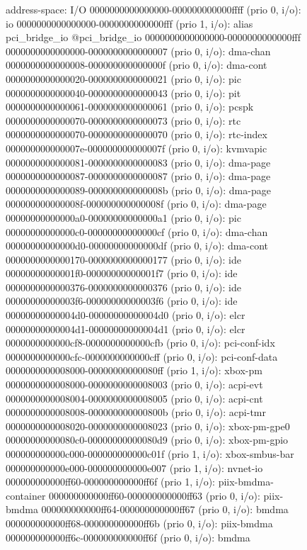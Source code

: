 \begin{figure}
\begin{minipage}{0.48\linewidth}
\begin{ffcode}
    address-space: I/O
      0000000000000000-000000000000ffff (prio 0, i/o): io
        0000000000000000-0000000000000fff (prio 1, i/o): alias pci_bridge_io @pci_bridge_io 0000000000000000-0000000000000fff
        0000000000000000-0000000000000007 (prio 0, i/o): dma-chan
        0000000000000008-000000000000000f (prio 0, i/o): dma-cont
        0000000000000020-0000000000000021 (prio 0, i/o): pic
        0000000000000040-0000000000000043 (prio 0, i/o): pit
        0000000000000061-0000000000000061 (prio 0, i/o): pcspk
        0000000000000070-0000000000000073 (prio 0, i/o): rtc
          0000000000000070-0000000000000070 (prio 0, i/o): rtc-index
        000000000000007e-000000000000007f (prio 0, i/o): kvmvapic
        0000000000000081-0000000000000083 (prio 0, i/o): dma-page
        0000000000000087-0000000000000087 (prio 0, i/o): dma-page
        0000000000000089-000000000000008b (prio 0, i/o): dma-page
        000000000000008f-000000000000008f (prio 0, i/o): dma-page
        00000000000000a0-00000000000000a1 (prio 0, i/o): pic
        00000000000000c0-00000000000000cf (prio 0, i/o): dma-chan
        00000000000000d0-00000000000000df (prio 0, i/o): dma-cont
        0000000000000170-0000000000000177 (prio 0, i/o): ide
        00000000000001f0-00000000000001f7 (prio 0, i/o): ide
        0000000000000376-0000000000000376 (prio 0, i/o): ide
        00000000000003f6-00000000000003f6 (prio 0, i/o): ide
        00000000000004d0-00000000000004d0 (prio 0, i/o): elcr
        00000000000004d1-00000000000004d1 (prio 0, i/o): elcr
        0000000000000cf8-0000000000000cfb (prio 0, i/o): pci-conf-idx
        0000000000000cfc-0000000000000cff (prio 0, i/o): pci-conf-data
        0000000000008000-00000000000080ff (prio 1, i/o): xbox-pm
          0000000000008000-0000000000008003 (prio 0, i/o): acpi-evt
          0000000000008004-0000000000008005 (prio 0, i/o): acpi-cnt
          0000000000008008-000000000000800b (prio 0, i/o): acpi-tmr
          0000000000008020-0000000000008023 (prio 0, i/o): xbox-pm-gpe0
          00000000000080c0-00000000000080d9 (prio 0, i/o): xbox-pm-gpio
        000000000000c000-000000000000c01f (prio 1, i/o): xbox-smbus-bar
        000000000000e000-000000000000e007 (prio 1, i/o): nvnet-io
        000000000000ff60-000000000000ff6f (prio 1, i/o): piix-bmdma-container
          000000000000ff60-000000000000ff63 (prio 0, i/o): piix-bmdma
          000000000000ff64-000000000000ff67 (prio 0, i/o): bmdma
          000000000000ff68-000000000000ff6b (prio 0, i/o): piix-bmdma
          000000000000ff6c-000000000000ff6f (prio 0, i/o): bmdma


\end{ffcode}
\end{minipage}
\end{figure}
